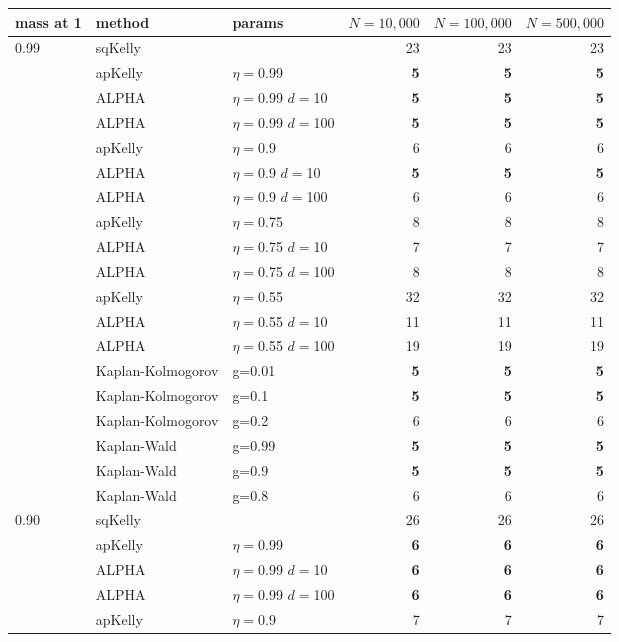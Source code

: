 \documentclass[aoas]{imsart}
\begin{document}
\begin{table}
\centering
\tiny
\begin{tabular}{lll|rrr} 
 mass at 1 & method & params & $N=10{,}000$ &  $N=100{,}000$ & $N=500{,}000$  \\
\hline 0.99 & sqKelly & & 23  & 23  & 23  \\
\cline{2-6} & apKelly & $\eta=$0.99 & \bf{5}  & \bf{5}  & \bf{5}  \\
\cline{2-6}
& ALPHA & $\eta=$0.99 $d=$10 & \bf{5}  & \bf{5}  & \bf{5}  \\
& ALPHA & $\eta=$0.99 $d=$100 & \bf{5}  & \bf{5}  & \bf{5}  \\
\cline{2-6} & apKelly & $\eta=$0.9 & 6  & 6  & 6  \\
\cline{2-6}
& ALPHA & $\eta=$0.9 $d=$10 & \bf{5}  & \bf{5}  & \bf{5}  \\
& ALPHA & $\eta=$0.9 $d=$100 & 6  & 6  & 6  \\
\cline{2-6} & apKelly & $\eta=$0.75 & 8  & 8  & 8  \\
\cline{2-6}
& ALPHA & $\eta=$0.75 $d=$10 & 7  & 7  & 7  \\
& ALPHA & $\eta=$0.75 $d=$100 & 8  & 8  & 8  \\
\cline{2-6} & apKelly & $\eta=$0.55 & 32  & 32  & 32  \\
\cline{2-6}
& ALPHA & $\eta=$0.55 $d=$10 & 11  & 11  & 11  \\
& ALPHA & $\eta=$0.55 $d=$100 & 19  & 19  & 19  \\
\cline{2-6}
 & Kaplan-Kolmogorov & g=0.01 & \bf{5}  & \bf{5}  & \bf{5}  \\
 & Kaplan-Kolmogorov & g=0.1 & \bf{5}  & \bf{5}  & \bf{5}  \\
 & Kaplan-Kolmogorov & g=0.2 & 6  & 6  & 6  \\
\cline{2-6}
 & Kaplan-Wald & g=0.99 & \bf{5}  & \bf{5}  & \bf{5}  \\
 & Kaplan-Wald & g=0.9 & \bf{5}  & \bf{5}  & \bf{5}  \\
 & Kaplan-Wald & g=0.8 & 6  & 6  & 6  \\
\hline 0.90 & sqKelly & & 26  & 26  & 26  \\
\cline{2-6} & apKelly & $\eta=$0.99 & \bf{6}  & \bf{6}  & \bf{6}  \\
\cline{2-6}
& ALPHA & $\eta=$0.99 $d=$10 & \bf{6}  & \bf{6}  & \bf{6}  \\
& ALPHA & $\eta=$0.99 $d=$100 & \bf{6}  & \bf{6}  & \bf{6}  \\
\cline{2-6} & apKelly & $\eta=$0.9 & 7  & 7  & 7  \\

\end{tabular}
\end{table}
\end{document}

